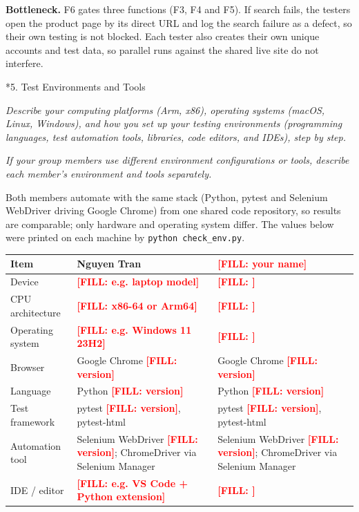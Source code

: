 \documentclass[11pt,a4paper]{article}
\makeatletter
\renewcommand\section{\@startsection{section}{1}{0pt}{3ex plus 1ex}{1.2ex}{\LARGE\bfseries}}
\newcommand{\instr}[1]{{\color{utsblue}\itshape #1\par}}
\newcommand{\FILL}[1]{\textcolor{red}{\textbf{[FILL: #1]}}}
\makeatother
\begin{document}
\textbf{Bottleneck.} F6 gates three functions (F3, F4 and F5). If search fails, the testers open the product page by its direct URL and log the search failure as a defect, so their own testing is not blocked. Each tester also creates their own unique accounts and test data, so parallel runs against the shared live site do not interfere.

\section*{5. Test Environments and Tools}
\instr{Describe your computing platforms (Arm, x86), operating systems (macOS, Linux, Windows), and how you set up your testing environments (programming languages, test automation tools, libraries, code editors, and IDEs), step by step.}
\instr{If your group members use different environment configurations or tools, describe each member's environment and tools separately.}

Both members automate with the same stack (Python, pytest and Selenium WebDriver driving Google Chrome) from one shared code repository, so results are comparable; only hardware and operating system differ. The values below were printed on each machine by \texttt{python check\_env.py}.

\begin{center}
{\renewcommand{\arraystretch}{1.25}
\begin{tabular}{|l|L{6.1cm}|L{6.1cm}|}
\hline
{}\textbf{Item} & \textbf{Nguyen Tran} & \textbf{\FILL{your name}} \\ \hline
Device            & \FILL{e.g. laptop model} & \FILL{} \\ \hline
CPU architecture  & \FILL{x86-64 or Arm64} & \FILL{} \\ \hline
Operating system  & \FILL{e.g. Windows 11 23H2} & \FILL{} \\ \hline
Browser           & Google Chrome \FILL{version} & Google Chrome \FILL{version} \\ \hline
Language          & Python \FILL{version} & Python \FILL{version} \\ \hline
Test framework    & pytest \FILL{version}, pytest-html & pytest \FILL{version}, pytest-html \\ \hline
Automation tool   & Selenium WebDriver \FILL{version}; ChromeDriver via Selenium Manager & Selenium WebDriver \FILL{version}; ChromeDriver via Selenium Manager \\ \hline
IDE / editor      & \FILL{e.g. VS Code + Python extension} & \FILL{} \\ \hline
\end{tabular}}
\end{center}
\end{document}
